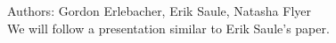\documentclass[11pt,color]{article}
\begin{document}
Authors: Gordon Erlebacher, Erik Saule, Natasha Flyer  \\



We will follow a presentation similar to Erik Saule's paper. 
%




\end{document}

